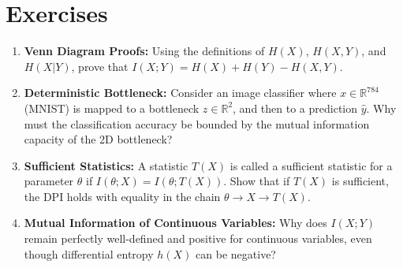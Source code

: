 \section*{Exercises}
\begin{enumerate}
    \item \textbf{Venn Diagram Proofs:} Using the definitions of $H(X)$, $H(X,Y)$, and $H(X|Y)$, prove that $I(X;Y) = H(X) + H(Y) - H(X,Y)$.
    \item \textbf{Deterministic Bottleneck:} Consider an image classifier where $x \in \mathbb{R}^{784}$ (MNIST) is mapped to a bottleneck $z \in \mathbb{R}^{2}$, and then to a prediction $\hat{y}$. Why must the classification accuracy be bounded by the mutual information capacity of the 2D bottleneck? 
    \item \textbf{Sufficient Statistics:} A statistic $T(X)$ is called a sufficient statistic for a parameter $\theta$ if $I(\theta; X) = I(\theta; T(X))$. Show that if $T(X)$ is sufficient, the DPI holds with equality in the chain $\theta \to X \to T(X)$. 
    \item \textbf{Mutual Information of Continuous Variables:} Why does $I(X;Y)$ remain perfectly well-defined and positive for continuous variables, even though differential entropy $h(X)$ can be negative?
\end{enumerate}

